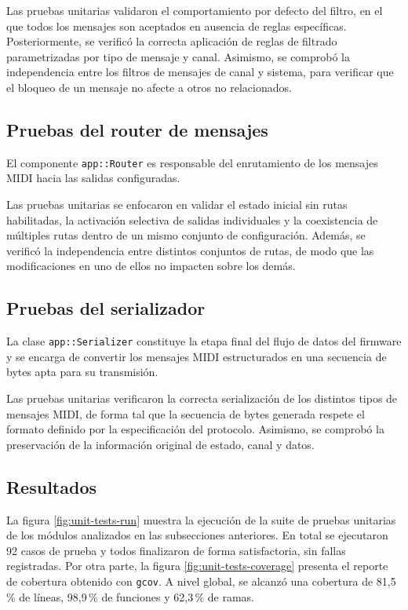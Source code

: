 Las pruebas unitarias validaron el comportamiento por defecto del filtro, en el que todos los mensajes son aceptados en ausencia de reglas específicas. Posteriormente, se verificó la correcta aplicación de reglas de filtrado parametrizadas por tipo de mensaje y canal. Asimismo, se comprobó la independencia entre los filtros de mensajes de canal y sistema, para verificar que el bloqueo de un mensaje no afecte a otros no relacionados.

\subsection{Pruebas del router de mensajes}
El componente \texttt{app::Router} es responsable del enrutamiento de los mensajes MIDI hacia las salidas configuradas.

Las pruebas unitarias se enfocaron en validar el estado inicial sin rutas habilitadas, la activación selectiva de salidas individuales y la coexistencia de múltiples rutas dentro de un mismo conjunto de configuración. Además, se verificó la independencia entre distintos conjuntos de rutas, de modo que las modificaciones en uno de ellos no impacten sobre los demás.

\subsection{Pruebas del serializador}
La clase \texttt{app::Serializer} constituye la etapa final del flujo de datos del firmware y se encarga de convertir los mensajes MIDI estructurados en una secuencia de bytes apta para su transmisión.

Las pruebas unitarias verificaron la correcta serialización de los distintos tipos de mensajes MIDI, de forma tal que la secuencia de bytes generada respete el formato definido por la especificación del protocolo. Asimismo, se comprobó la preservación de la información original de estado, canal y datos.

\subsection{Resultados}

La figura \ref{fig:unit-tests-run} muestra la ejecución de la suite de pruebas unitarias de los módulos analizados en las subsecciones anteriores. En total se ejecutaron 92 casos de prueba y todos finalizaron de forma satisfactoria, sin fallas registradas. Por otra parte, la figura \ref{fig:unit-tests-coverage} presenta el reporte de cobertura obtenido con \texttt{gcov}. A nivel global, se alcanzó una cobertura de 81,5\,\% de líneas, 98,9\,\% de funciones y 62,3\,\% de ramas.

